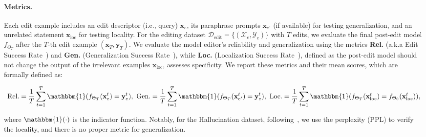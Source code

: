\documentclass{article}
\begin{document}
\paragraph{Metrics.} 
Each edit example includes an edit descriptor (i.e., query) $\mathbf{x}_e$, its paraphrase prompts $\mathbf{x}_{e'}$ (if available) for testing generalization, and an unrelated statement $\mathbf{x}_{\text{loc}}$ for testing locality. 
For the editing dataset $\mathcal{D}_{\text{edit}}= \{(\mathcal{X}_e, \mathcal{Y}_e)\}$ with $T$ edits, we evaluate the final post-edit model $f_{\Theta_{T}}$ after the $T$-th edit example $(\mathbf{x}_T, \mathbf{y}_T)$. 
We evaluate the model editor's reliability and generalization using the metrics \textbf{Rel.} (a.k.a Edit Success Rate~\cite{grace}) and \textbf{Gen.} (Generalization Success Rate~\cite{knowledge_editing_survey_2}), while \textbf{Loc.} (Localization Success Rate~\cite{knowledge_editing_survey_2}), defined as the post-edit model should not change the output of the irrelevant examples $\mathbf{x}_{\text{loc}}$, assesses specificity.
We report these metrics and their mean scores, which are formally defined as:
\begin{scriptsize}
\begin{equation}\label{equ:metrics}
        \text{Rel}. = \frac{1}{T}\sum\limits_{t=1}^{T} \mathbbm{1}(f_{\Theta_{T}}(\mathbf{x}_e^t) = \mathbf{y}_e^t),\
        \text{Gen}. = \frac{1}{T}\sum\limits_{t=1}^{T} \mathbbm{1}(f_{\Theta_{T}}(\mathbf{x}_{e'}^t) = \mathbf{y}_e^t),\
        \text{Loc}. = \frac{1}{T}\sum\limits_{t=1}^{T} \mathbbm{1}(f_{\Theta_{T}}(\mathbf{x}_{\text{loc}}^{t}) = f_{\Theta_{0}}(\mathbf{x}_{\text{loc}}^{t})),
\end{equation}
\end{scriptsize}
where $\mathbbm{1}(\cdot)$ is the indicator function. Notably, for the Hallucination dataset, following~\cite{grace}, we use the perplexity (PPL) to verify the locality, and there is no proper metric for generalization.


    
    
\end{document}
